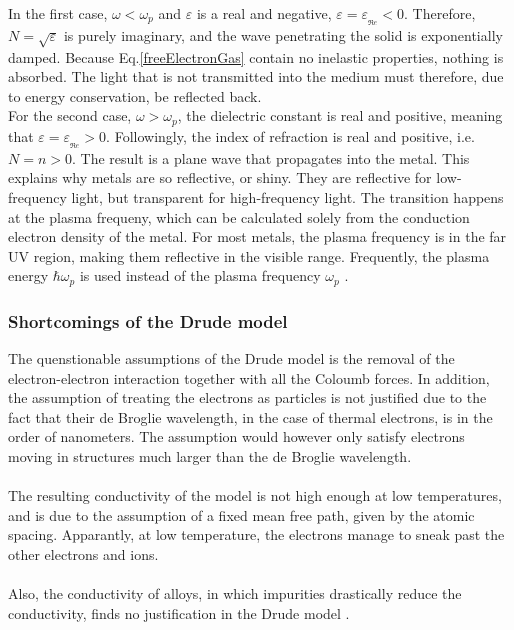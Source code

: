 In the first case, $\omega < \omega_p$ 
and $\varepsilon$ is a real and negative, $\varepsilon = \varepsilon\!_{_{\Re\! e}} < 0$.
Therefore, $N = \sqrt{\varepsilon}$ is purely imaginary, and the wave penetrating the solid
is exponentially damped. Because Eq.\eqref{freeElectronGas} contain no inelastic properties, nothing
is absorbed. The light that is not transmitted into the medium must therefore, due to energy conservation, be
reflected back. \\
For the second case, $\omega > \omega_p$, the dielectric constant is real and positive,
meaning that $\varepsilon = \varepsilon\!_{_{\Re\! e}} > 0$.
Followingly, the index of refraction is real and positive, i.e. $N = n > 0$. 
The result is a plane wave that propagates 
into the metal. This explains why metals are so reflective, or shiny. They are reflective for 
low-frequency light, but transparent for high-frequency light. The transition happens
at the plasma frequeny, which can be calculated solely from the conduction electron density of 
the metal. For most metals, the plasma frequency is in the far UV region, making them reflective 
in the visible range. Frequently, the plasma energy $\hbar \omega_p$ is used instead of the plasma frequency
$\omega_p$ \cite[p.~76-79]{Hofmann}.

\subsubsection{Shortcomings of the Drude model}
The quenstionable assumptions of the Drude model is the removal of the electron-electron interaction
together with all the Coloumb forces. In addition, the assumption of treating the electrons as 
particles is not justified due to the fact that their de Broglie wavelength, in the case of thermal
electrons, is in the order of nanometers. The assumption would however only satisfy electrons moving
in structures much larger than the de Broglie wavelength.
\\
\\
The resulting conductivity of the model is not high enough at low temperatures, and is due to the
assumption of a fixed mean free path, given by the atomic spacing. Apparantly, at low temperature,
the electrons manage to sneak past the other electrons and ions. 
\\
\\
Also, the conductivity of alloys, in which impurities drastically reduce the conductivity, finds no
justification in the Drude model \cite[p.~80-81]{Hofmann}. 





